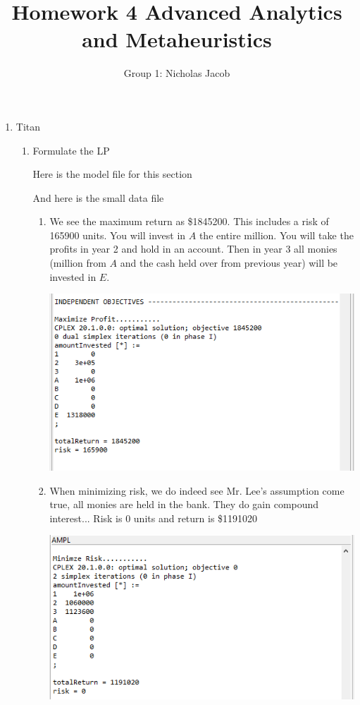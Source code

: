 \documentclass[11pt]{article}
\author{Group 1:  Nicholas Jacob}
\title{Homework 4 Advanced Analytics and Metaheuristics}
\begin{document}
\maketitle

\begin{enumerate}
\item Titan
\begin{enumerate}

\item Formulate the LP

Here is the model file for this section

{\tiny {}}

And here is the small data file

{\tiny {}}

\begin{enumerate}
\item We see the maximum return as \$1845200.  This includes a risk of 165900 units.  You will invest in $A$ the entire million.  You will take the profits in year 2 and hold in an account.  Then in year 3 all monies (million from $A$ and the cash held over from previous year) will be invested in $E$.

\includegraphics[width = .9\textwidth]{output1ai.png}

\item When minimizing risk, we do indeed see Mr. Lee's assumption come true, all monies are held in the bank.  They do gain compound interest...  Risk is 0 units and return is \$1191020

 \includegraphics[width = .9\textwidth]{output1aii.png}


\end{enumerate}
\end{enumerate}
\end{enumerate}
\end{document}
